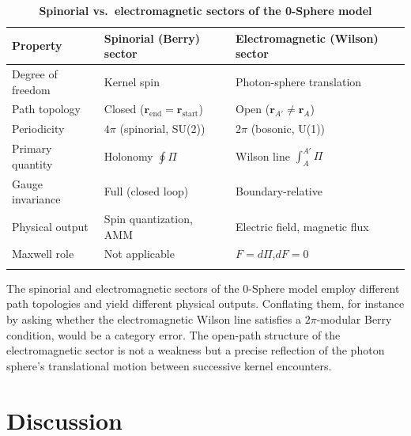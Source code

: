 \documentclass[%
 reprint, amsmath,amssymb, aps, prb, ]{revtex4-2}
\numberwithin{equation}{section}
\begin{document}
\begin{table}[t!]
\centering
\caption{\textbf{Spinorial vs.\ electromagnetic sectors of the 0-Sphere model}}
\label{tab:sectors}
\renewcommand{\arraystretch}{1.4}
\begin{tabular}{p{4.5cm}p{5.5cm}p{5.5cm}}
\toprule
\textbf{Property} & \textbf{Spinorial (Berry) sector} & \textbf{Electromagnetic (Wilson) sector} \\
\midrule
Degree of freedom
& Kernel spin
& Photon-sphere translation \\
\addlinespace[0.3cm]
Path topology
& Closed ($\mathbf{r}_{\text{end}}=\mathbf{r}_{\text{start}}$)
& Open ($\mathbf{r}_{A'}\neq\mathbf{r}_A$) \\
\addlinespace[0.3cm]
Periodicity
& $4\pi$ (spinorial, SU(2))
& $2\pi$ (bosonic, U(1)) \\
\addlinespace[0.3cm]
Primary quantity
& Holonomy $\oint\Pi$
& Wilson line $\int_A^{A'}\Pi$ \\
\addlinespace[0.3cm]
Gauge invariance
& Full (closed loop)
& Boundary-relative \\
\addlinespace[0.3cm]
Physical output
& Spin quantization, AMM
& Electric field, magnetic flux \\
\addlinespace[0.3cm]
Maxwell role
& Not applicable
& $F=d\Pi$,\quad $dF=0$ \\
\addlinespace[0.2cm]
\bottomrule
\end{tabular}
\vspace{0.2cm}
\begin{minipage}{0.95\textwidth}
\justifying\footnotesize
The spinorial and electromagnetic sectors of the 0-Sphere model employ different path topologies and yield different physical outputs. Conflating them, for instance by asking whether the electromagnetic Wilson line satisfies a $2\pi$-modular Berry condition, would be a category error. The open-path structure of the electromagnetic sector is not a weakness but a precise reflection of the photon sphere's translational motion between successive kernel encounters.
\end{minipage}
\end{table}

\section{Discussion}
\label{sec:discuss}

\end{document}
